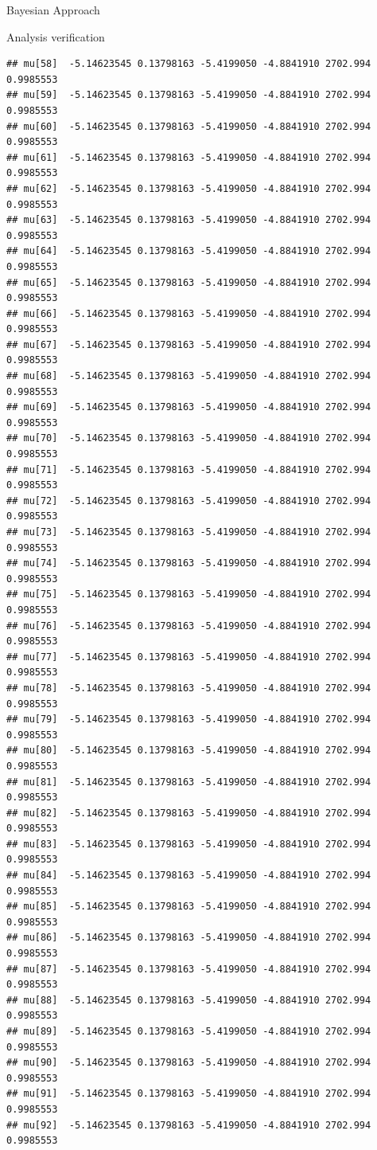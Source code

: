 \documentclass[
  ignorenonframetext,
]{beamer}
\begin{document}
\begin{frame}[fragile]{Bayesian Approach}
\begin{block}{Analysis verification}
\begin{verbatim}
## mu[58]  -5.14623545 0.13798163 -5.4199050 -4.8841910 2702.994 0.9985553
## mu[59]  -5.14623545 0.13798163 -5.4199050 -4.8841910 2702.994 0.9985553
## mu[60]  -5.14623545 0.13798163 -5.4199050 -4.8841910 2702.994 0.9985553
## mu[61]  -5.14623545 0.13798163 -5.4199050 -4.8841910 2702.994 0.9985553
## mu[62]  -5.14623545 0.13798163 -5.4199050 -4.8841910 2702.994 0.9985553
## mu[63]  -5.14623545 0.13798163 -5.4199050 -4.8841910 2702.994 0.9985553
## mu[64]  -5.14623545 0.13798163 -5.4199050 -4.8841910 2702.994 0.9985553
## mu[65]  -5.14623545 0.13798163 -5.4199050 -4.8841910 2702.994 0.9985553
## mu[66]  -5.14623545 0.13798163 -5.4199050 -4.8841910 2702.994 0.9985553
## mu[67]  -5.14623545 0.13798163 -5.4199050 -4.8841910 2702.994 0.9985553
## mu[68]  -5.14623545 0.13798163 -5.4199050 -4.8841910 2702.994 0.9985553
## mu[69]  -5.14623545 0.13798163 -5.4199050 -4.8841910 2702.994 0.9985553
## mu[70]  -5.14623545 0.13798163 -5.4199050 -4.8841910 2702.994 0.9985553
## mu[71]  -5.14623545 0.13798163 -5.4199050 -4.8841910 2702.994 0.9985553
## mu[72]  -5.14623545 0.13798163 -5.4199050 -4.8841910 2702.994 0.9985553
## mu[73]  -5.14623545 0.13798163 -5.4199050 -4.8841910 2702.994 0.9985553
## mu[74]  -5.14623545 0.13798163 -5.4199050 -4.8841910 2702.994 0.9985553
## mu[75]  -5.14623545 0.13798163 -5.4199050 -4.8841910 2702.994 0.9985553
## mu[76]  -5.14623545 0.13798163 -5.4199050 -4.8841910 2702.994 0.9985553
## mu[77]  -5.14623545 0.13798163 -5.4199050 -4.8841910 2702.994 0.9985553
## mu[78]  -5.14623545 0.13798163 -5.4199050 -4.8841910 2702.994 0.9985553
## mu[79]  -5.14623545 0.13798163 -5.4199050 -4.8841910 2702.994 0.9985553
## mu[80]  -5.14623545 0.13798163 -5.4199050 -4.8841910 2702.994 0.9985553
## mu[81]  -5.14623545 0.13798163 -5.4199050 -4.8841910 2702.994 0.9985553
## mu[82]  -5.14623545 0.13798163 -5.4199050 -4.8841910 2702.994 0.9985553
## mu[83]  -5.14623545 0.13798163 -5.4199050 -4.8841910 2702.994 0.9985553
## mu[84]  -5.14623545 0.13798163 -5.4199050 -4.8841910 2702.994 0.9985553
## mu[85]  -5.14623545 0.13798163 -5.4199050 -4.8841910 2702.994 0.9985553
## mu[86]  -5.14623545 0.13798163 -5.4199050 -4.8841910 2702.994 0.9985553
## mu[87]  -5.14623545 0.13798163 -5.4199050 -4.8841910 2702.994 0.9985553
## mu[88]  -5.14623545 0.13798163 -5.4199050 -4.8841910 2702.994 0.9985553
## mu[89]  -5.14623545 0.13798163 -5.4199050 -4.8841910 2702.994 0.9985553
## mu[90]  -5.14623545 0.13798163 -5.4199050 -4.8841910 2702.994 0.9985553
## mu[91]  -5.14623545 0.13798163 -5.4199050 -4.8841910 2702.994 0.9985553
## mu[92]  -5.14623545 0.13798163 -5.4199050 -4.8841910 2702.994 0.9985553

\end{verbatim}
\end{block}
\end{frame}
\end{document}
